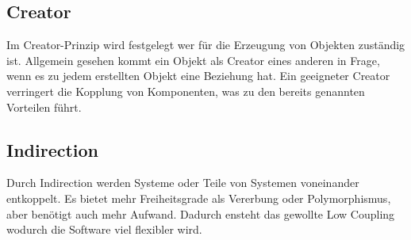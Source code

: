 \subsection{Creator}
Im Creator-Prinzip wird festgelegt wer für die Erzeugung von Objekten zuständig ist.
Allgemein gesehen kommt ein Objekt als Creator eines anderen in Frage, wenn es zu jedem erstellten Objekt eine Beziehung hat.
Ein geeigneter Creator verringert die Kopplung von Komponenten, was zu den bereits genannten Vorteilen führt.
\subsection{Indirection}
Durch Indirection werden Systeme oder Teile von Systemen voneinander entkoppelt.
Es bietet mehr Freiheitsgrade als Vererbung oder Polymorphismus, aber benötigt auch mehr Aufwand.
Dadurch ensteht das gewollte Low Coupling wodurch die Software viel flexibler wird.
